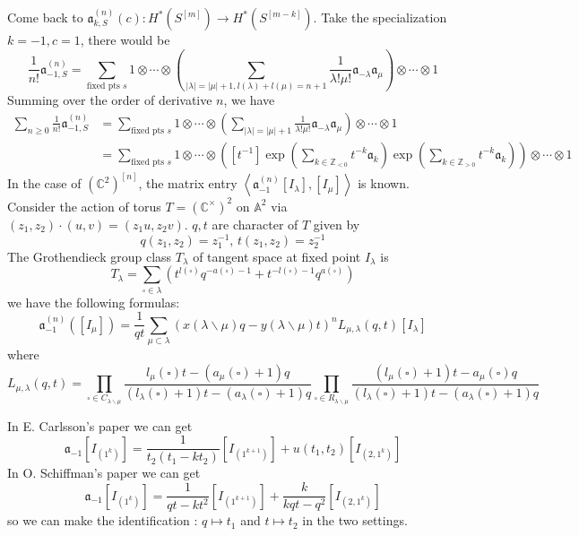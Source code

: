 \documentclass{article}
\renewcommand{\frak}[1]{\mathfrak{#1}}
\newcommand{\s}{\square}
\begin{document}
Come back to $\mathfrak{a}_{k,S}^{(n)}(c):H^*(S^{[m]})\to H^*(S^{[m-k]})$. Take the specialization $k=-1, c=1$, there would be
\[
\frac{1}{n!}\frak{a}_{-1,S}^{(n)}=\sum_{\text{fixed pts }s} 1\otimes\cdots\otimes\left(\sum_{|\lambda|=|\mu|+1,l(\lambda)+l(\mu)=n+1}\frac{1}{\lambda!\mu!}\frak{a}_{-\lambda}\frak{a}_{\mu}\right)\otimes\cdots\otimes1
\]
Summing over the order of derivative $n$, we have 
\[
\begin{aligned}
\sum_{n\geqslant 0} \frac{1}{n!}\frak{a}_{-1,S}^{(n)} &= \sum_{\text{fixed pts }s} 1\otimes\cdots\otimes\left(\sum_{|\lambda|=|\mu|+1}\frac{1}{\lambda!\mu!}\frak{a}_{-\lambda}\frak{a}_{\mu}\right)\otimes\cdots\otimes1\\
&= \sum_{\text{fixed pts }s} 1\otimes\cdots\otimes\left([t^{-1}]\exp\left(\sum_{k\in \mathbb{Z}_{<0}}t^{-k}\mathfrak{a}_k\right)\exp\left(\sum_{k\in \mathbb{Z}_{>0}}t^{-k}\mathfrak{a}_k\right)\right)\otimes\cdots\otimes1
\end{aligned}
\]
In the case of $(\mathbb{C}^2)^{[n]}$, the matrix entry $\left<\frak{a}_{-1}^{(n)}[I_\lambda], [I_\mu]\right>$ is known. Consider the action of torus $T=(\mathbb{C}^{\times})^2$ on $\mathbb{A}^2$ via $(z_1,z_2)\cdot(u,v)=(z_1u,z_2v)$. $q,t$ are character of $T$ given by \[q(z_1,z_2)=z_1^{-1}\text{,         }t(z_1,z_2)=z_2^{-1}\]
The Grothendieck group class $T_\lambda$ of tangent space at fixed point $I_\lambda$ is 
\[T_\lambda = \sum_{\square\in\lambda}(t^{l(\square)}q^{-a(\square)-1}+t^{-l(\square)-1}q^{a(\square)})\]
we have the following formulas:
\[
\frak{a}_{-1}^{(n)}([I_\mu]) = \frac{1}{qt}\sum_{\mu\subset\lambda}(x(\lambda\backslash\mu)q-y(\lambda\backslash\mu)t)^nL_{\mu,\lambda}(q,t)[I_\lambda]
\]
where 
\[
L_{\mu,\lambda}(q,t) = \prod_{\s\in C_{\lambda\backslash\mu}}\frac{l_\mu(\s)t-(a_{\mu}(\s)+1)q}{(l_\lambda(\s)+1)t-(a_\lambda(\s)+1)q}\prod_{\s\in R_{\lambda\backslash\mu}}\frac{(l_\mu(\s)+1)t-a_{\mu}(\s)q}{(l_\lambda(\s)+1)t-(a_\lambda(\s)+1)q}\]

In E. Carlsson's paper we can get 
\[\frak{a}_{-1}[I_{(1^k)}] = \frac{1}{t_2(t_1-kt_2)}[I_{(1^{k+1})}]+u(t_1,t_2)[I_{(2,1^k)}]\]
In O. Schiffman's paper we can get
\[\frak{a}_{-1}[I_{(1^k)}] = \frac{1}{qt-kt^2}[I_{(1^{k+1})}]+\frac{k}{kqt-q^2}[I_{(2,1^k)}]\]
so we can make the identification : $q\mapsto t_1$ and $t\mapsto t_2$ in the two settings.
\end{document}
